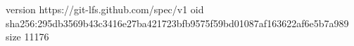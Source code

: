 version https://git-lfs.github.com/spec/v1
oid sha256:295db3569b43c3416e27ba421723bfb9575f59bd01087af163622af6e5b7a989
size 11176
